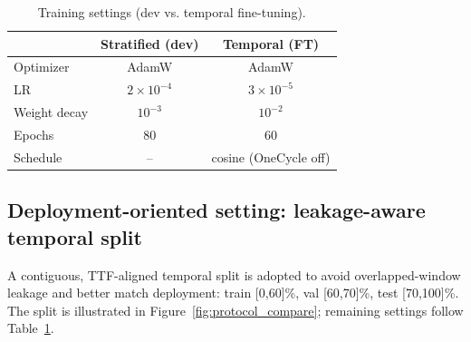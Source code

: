 \documentclass[pdflatex,sn-mathphys-num]{sn-jnl}%
\begin{document}
\begin{table}[htbp]
\caption{Training settings (dev vs. temporal fine-tuning).}
\label{tab:settings}
\centering
\begin{tabular}{lcc}
\toprule
 & Stratified (dev) & Temporal (FT) \\
\midrule
Optimizer & AdamW & AdamW \\
LR & $2\times10^{-4}$ & $3\times10^{-5}$ \\
Weight decay & $10^{-3}$ & $10^{-2}$ \\
Epochs & 80 & 60 \\
Schedule & -- & cosine (OneCycle off) \\
\bottomrule
\end{tabular}
\end{table}

\subsection{Deployment-oriented setting: leakage-aware temporal split}
A contiguous, TTF-aligned temporal split is adopted to avoid overlapped-window leakage and better match deployment: train [0,60]\%, val [60,70]\%, test [70,100]\%. The split is illustrated in Figure~\ref{fig:protocol_compare}; remaining settings follow Table~\ref{tab:settings}.
\end{document}
